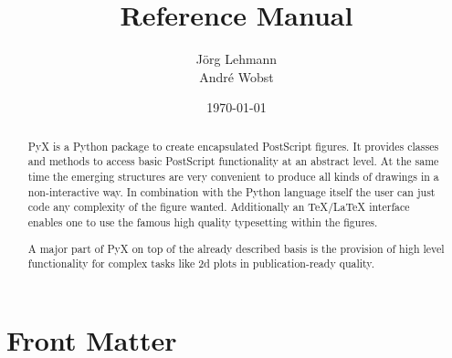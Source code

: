\documentclass{manual}
\title{\PyX{} Reference Manual}
\author{J\"org Lehmann\\
Andr\'e Wobst}
\date{\today}
\def\PyX{PyX}
\begin{document}
\maketitle

\ifhtml %
\chapter*{Front Matter\label{front}}
\fi
\begin{abstract}
\noindent
\PyX{} is a Python package to create encapsulated PostScript figures. It
provides classes and methods to access basic PostScript functionality
at an abstract level. At the same time the emerging structures are
very convenient to produce all kinds of drawings in a non-interactive
way. In combination with the Python language itself the user can just
code any complexity of the figure wanted. Additionally an
\TeX{}/\LaTeX{} interface enables one to use the famous high quality
typesetting within the figures.

A major part of \PyX{} on top of the already described basis is the
provision of high level functionality for complex tasks like 2d plots
in publication-ready quality.
\end{abstract}

\tableofcontents















\appendix







\end{document}
